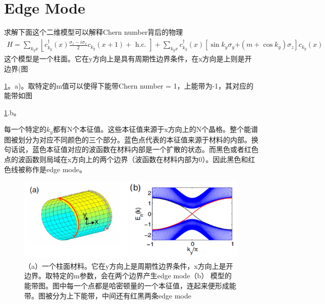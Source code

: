 \section{Edge Mode}

求解下面这个二维模型可以解释Chern number背后的物理
\begin{equation}
\begin{aligned} H= \sum_{k_{y} x}\left\lfloor c_{k_{y}}^{\dagger}(x) \frac{\sigma_{z}-i \sigma_{x}}{2} c_{k_{y}}(x+1)+\text { h.c. }\right]+\sum_{k_{y} x} c_{k_{y}}^{\dagger}(x)\left[\sin k_{y} \sigma_{y}\right. \left.+\left(m+\cos k_{y}\right) \sigma_{z}\right] c_{k_{y}}(x) \end{aligned}
\end{equation}
这个模型是一个柱面。它在y方向上是具有周期性边界条件，在x方向是上则是开边界(图{\ref{edgePPT}。a)。取特定的m值可以使得下能带Chern number = 1，上能带为-1，其对应的能带如图{\ref{edgePPT}.b。

每一个特定的$k_y$都有N个本征值。这些本征值来源于x方向上的N个晶格。整个能谱图被划分为对应不同颜色的三个部分。蓝色点代表的本征值来源于材料的内部。换句话说，蓝色本征值对应的波函数在材料内部是一个扩散的状态。而黑色或者红色点的波函数则局域在x方向上的两个边界（波函数在材料内部为0）。因此黑色和红色线被称作是edge mode。

\begin {figure}[tbp]
\centering 
\includegraphics[width=14cm]{./images/edgePPT.png} 
\caption{（a）一个柱面材料。它在y方向上是周期性边界条件，x方向上是开边界。取特定的m参数，会在两个边界产生edge mode（b） 模型的能带图。图中每一个点都是哈密顿量的一个本征值，连起来便形成能带。图被分为上下能带，中间还有红黑两条edge mode\cite{yanhe}}
\label{edgePPT}
\end {figure} 

}}

